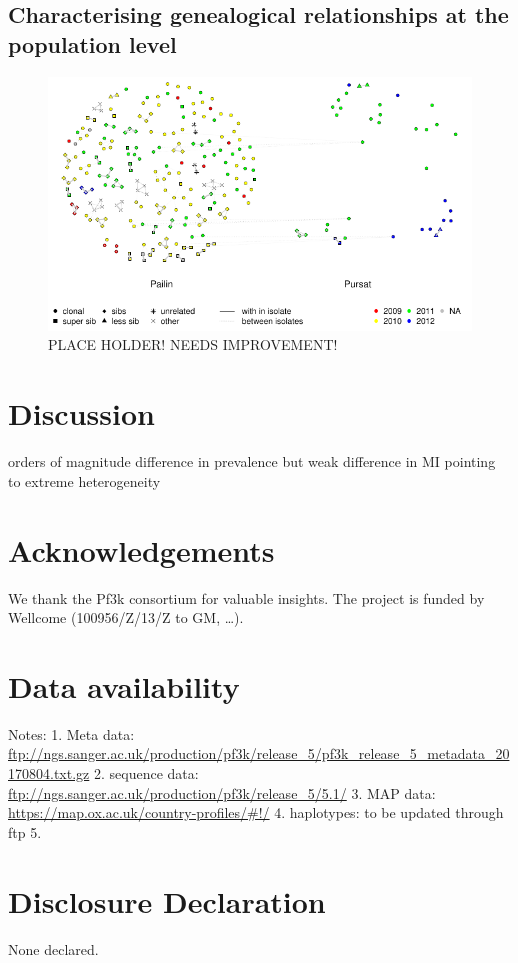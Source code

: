 \documentclass[9pt,lineno]{elife}
\begin{document}
\subsection{Characterising genealogical relationships at the population level}



\begin{figure}[ht]
  \centering{}
  \includegraphics[width=\textwidth]{Fig6.pdf}
  \caption{PLACE HOLDER! NEEDS IMPROVEMENT!}
  \label{fig:NNplot}
\end{figure}










\section{Discussion}


orders of magnitude difference in prevalence but weak difference in MI pointing to extreme heterogeneity

\section{Acknowledgements}
We thank the Pf3k consortium for valuable insights. The project is funded by  Wellcome (100956/Z/13/Z to GM, \ldots).


\section{Data availability}
Notes: 1. Meta data: \url{ftp://ngs.sanger.ac.uk/production/pf3k/release_5/pf3k_release_5_metadata_20170804.txt.gz}
2. sequence data: \url{ftp://ngs.sanger.ac.uk/production/pf3k/release_5/5.1/}
3. MAP data: \url{https://map.ox.ac.uk/country-profiles/#!/}
4. haplotypes: to be updated through ftp
5. 

\section{Disclosure Declaration}
None declared.






\end{document}

